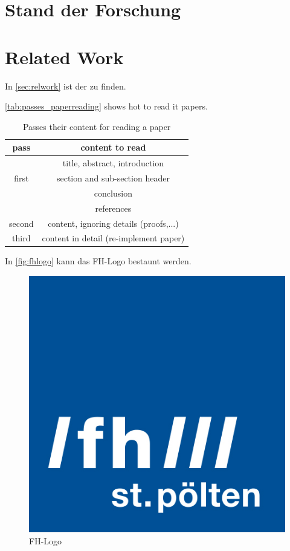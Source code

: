 \ifisGerman
    \chapter{Stand der Forschung}
\else
    \chapter{Related Work}
\fi
\label{sec:relwork}

In \autoref{sec:relwork} ist der  zu finden.


\autoref{tab:passes_paperreading} shows hot to read \gls{it} papers.

\begin{table}[h]
\centering
\begin{tabular}{|c|c|}
    \hline
    \textbf{pass} & \textbf{content to read} \\ \hline
    \multirow{3}{*}{first} & title, abstract, introduction \\ \cline{2-2}
                           & section and sub-section header \\ \cline{2-2}
                           & conclusion \\ \cline{2-2}
                           & references \\ \hline
    second & content, ignoring details (proofs,...) \\ \hline
    third & content in detail (re-implement paper) \\ \hline
\end{tabular}
\caption{Passes their content for reading a paper}
\label{tab:passes_paperreading}
\end{table}


In \autoref{fig:fhlogo} kann das FH-Logo bestaunt werden.

\begin{figure}[ht]
    \centering
    \includegraphics[scale=0.2]{gfx/fh_logo}
    \caption{FH-Logo}
    \label{fig:fhlogo}
\end{figure}


